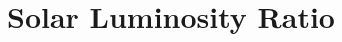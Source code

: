 \hypertarget{group___e_g_x_phys-_astrophysics-_solar_luminosity_ratio}{}\section{Solar Luminosity Ratio}
\label{group___e_g_x_phys-_astrophysics-_solar_luminosity_ratio}

